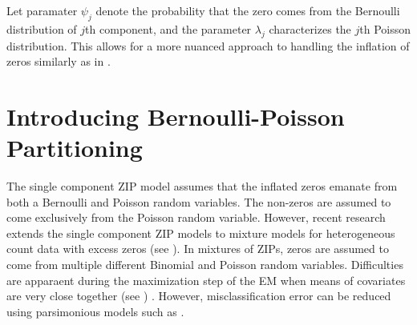 \documentclass[11pt,letterpaper]{article}
\numberwithin{equation}{section}
\numberwithin{equation}{section}
\numberwithin{equation}{section}
\begin{document}
Let paramater $\psi_j$ denote the probability that the zero comes from the Bernoulli distribution of $j$th component, and the parameter $ \lambda_j $ characterizes the $j$th Poisson distribution. This allows for a more nuanced approach to handling the inflation of zeros similarly as in \cite{Bermudez+Karlis:2012}.  
\section{Introducing Bernoulli-Poisson Partitioning}

The single component ZIP model assumes that the inflated zeros emanate from both a Bernoulli and Poisson random variables. The non-zeros are assumed to come exclusively from the Poisson random variable. However, recent research  extends the single component ZIP models to mixture models for heterogeneous count data with excess zeros (see  \citep{Bermudez+Karlis:2012}). In mixtures of ZIPs, zeros are assumed to come from multiple different Binomial and Poisson random variables.  Difficulties are apparaent  during the maximization step of the EM when means of covariates are very close together (see  \cite{LimHwa}) . However, misclassification error can be reduced using parsimonious models such as  \cite{McNicholas:2010}. 
\end{document}
